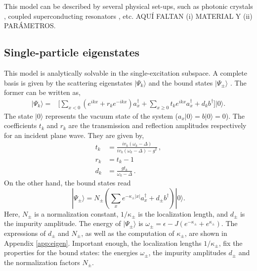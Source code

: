 \documentclass[aps,pra,twocolumn,floatfix,superscriptaddress]{revtex4-1}%
\begin{document}
This model can be described by several physical set-ups, such as photonic crystals \cite{Lodahl2015}, coupled superconducting resonators \cite{liu2016}, etc. {\color{red}AQU\'I FALTAN (i) MATERIAL Y (ii) PAR\'AMETROS.}


\subsection{Single-particle eigenstates}

This model is analytically solvable in the single-excitation subspace. A complete basis is given by the scattering eigenstates $|\Psi_k\rangle$ \cite{Nori2008a} and the bound states $|\Psi_\pm\rangle$ \cite{Longo2010,Longo2011}. The former can be written as,
\begin{align}
\label{eq:scattering_states} 
|\Psi_k\rangle = & \Big [ \sum_{x<0}(e^{ikx}+r_k e^{-ikx})a_x^\dagger 
 +  \sum_{x\geq 0} t_k e^{ikx} a_x^\dagger 
+ d_k b^\dagger \Big]  |0\rangle.
\end{align}
The state $|0\rangle$ represents the vacuum state of the system ($a_x|0\rangle=b|0\rangle = 0$).
The coefficients 
 $t_k$ and $r_k$ are the  
 transmission and reflection amplitudes respectively
for an incident plane wave.  They are given by, 
\begin{align}
\label{eq:transmission}
t_k & =\frac{iv_k(\omega_k - \Delta)}{iv_k(\omega_k-\Delta)-g^2} \, , 
\\
\label{eq:reflection}
r_k&=t_k-1 
\\ 
d_k  &= \frac{g t_k}{\omega_k-\Delta} \,
\label{eq:d_scattering_states}.
\end{align} 
On the other hand, the bound states read
\begin{equation}
 |\Psi_\pm\rangle =  N_\pm \left(\sum_x e^{-\kappa_\pm |x|} a_x^\dagger + d_\pm b^\dagger\right)|0\rangle.\label{eq:bound_states}
\end{equation} 
Here, $N_\pm$ is a normalization constant, $1/\kappa_\pm$ is the localization length, and $d_\pm$ is  the impurity amplitude. The energy of $|\Psi_\pm\rangle$ is $\omega_\pm = \epsilon - J(e^{-\kappa_\pm} + e^{\kappa_\pm})$. The expressions of $d_\pm$ and $N_\pm$, as well as the computation of $\kappa_\pm$, are shown in Appendix \ref{app:eigen}. Important enough, the localization lengths  $1/\kappa_\pm$, 
fix the properties for the bound states: the energies $\omega_\pm$, the impurity amplitudes $d_\pm$ and the normalization factors $N_\pm$.
\end{document}
